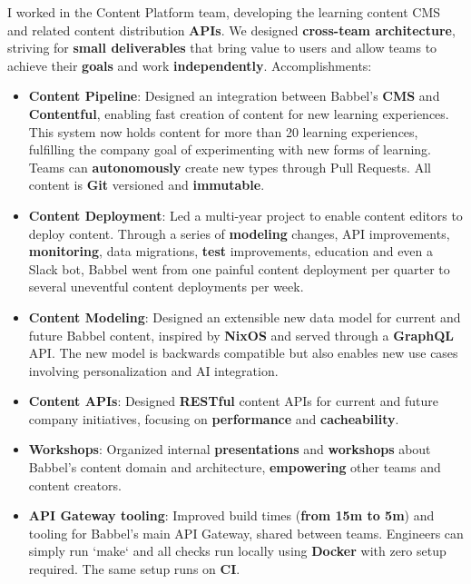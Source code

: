\documentclass[10pt,a4paper,ragged2e,withhyper]{altacv}
\begin{document}
\begin{paracol}{2}



{\RaggedRight
I worked in the Content Platform team, developing the learning content CMS and related content distribution \textbf{APIs}. We designed \textbf{cross-team architecture}, striving for \textbf{small deliverables} that bring value to users and allow teams to achieve their \textbf{goals} and work \textbf{independently}. Accomplishments:

\begin{itemize}
\item \textbf{Content Pipeline}: Designed an integration between Babbel's \textbf{CMS} and \textbf{Contentful}, enabling fast creation of content for new learning experiences. This system now holds content for more than 20 learning experiences, fulfilling the company goal of experimenting with new forms of learning. Teams can \textbf{autonomously} create new types through Pull Requests. All content is \textbf{Git} versioned and \textbf{immutable}.
\item \textbf{Content Deployment}: Led a multi-year project to enable content editors to deploy content. Through a series of \textbf{modeling} changes, API improvements, \textbf{monitoring}, data migrations, \textbf{test} improvements, education and even a Slack bot, Babbel went from one painful content deployment per quarter to several uneventful content deployments per week.
\item \textbf{Content Modeling}: Designed an extensible new data model for current and future Babbel content, inspired by \textbf{NixOS} and served through a \textbf{GraphQL} API. The new model is backwards compatible but also enables new use cases involving personalization and AI integration.
\item \textbf{Content APIs}: Designed \textbf{RESTful} content APIs for current and future company initiatives, focusing on \textbf{performance} and \textbf{cacheability}.
\item \textbf{Workshops}: Organized internal \textbf{presentations} and \textbf{workshops} about Babbel's content domain and architecture, \textbf{empowering} other teams and content creators.
\item \textbf{API Gateway tooling}: Improved build times (\textbf{from 15m to 5m}) and tooling for Babbel's main API Gateway, shared between teams. Engineers can simply run `make` and all checks run locally using \textbf{Docker} with zero setup required. The same setup runs on \textbf{CI}.

\end{itemize}}
\end{paracol}
\end{document}
